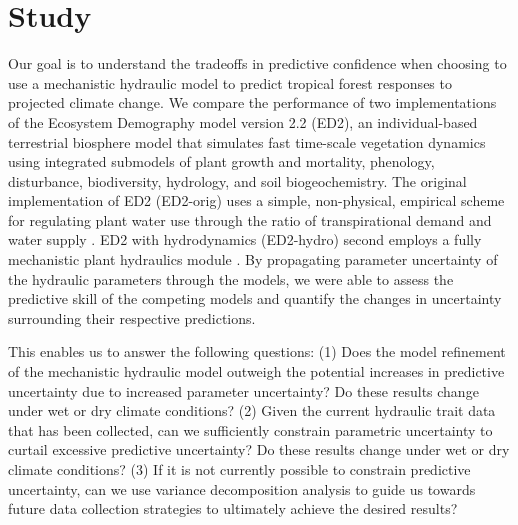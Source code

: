 \section*{Study}

Our goal is to understand the tradeoffs in predictive confidence when choosing to use a mechanistic hydraulic model to predict tropical forest responses to projected climate change. We compare the performance of two implementations of the Ecosystem Demography model version 2.2 (ED2), an individual-based terrestrial biosphere model that simulates fast  time-scale  vegetation dynamics using integrated submodels of plant growth and mortality, phenology, disturbance, biodiversity, hydrology, and soil biogeochemistry. The original implementation of ED2 (ED2-orig) uses a simple, non-physical, empirical scheme for regulating plant water use through the ratio of transpirational demand and water supply \citep{moorcroft_2001, medvigy_2009, longo_2019}. ED2 with hydrodynamics (ED2-hydro) second employs a fully mechanistic plant hydraulics module \citep{medvigy_2009, powell_2018, xu_2016, longo_2019}. By  propagating parameter uncertainty of the hydraulic parameters through the models, we were able to assess the predictive skill of the competing models and quantify the changes in uncertainty surrounding their respective predictions.

This enables us to answer the following questions: (1) Does the model refinement of the mechanistic hydraulic model outweigh the potential increases in predictive uncertainty due to increased parameter uncertainty? Do these results change under wet or dry climate conditions? (2) Given the current hydraulic trait data that has been collected, can we sufficiently constrain parametric uncertainty to curtail excessive predictive uncertainty? Do these results change under wet or dry climate conditions? (3) If it is not currently possible to constrain predictive uncertainty, can we use variance decomposition analysis to guide us towards future data collection strategies to ultimately achieve the desired results?